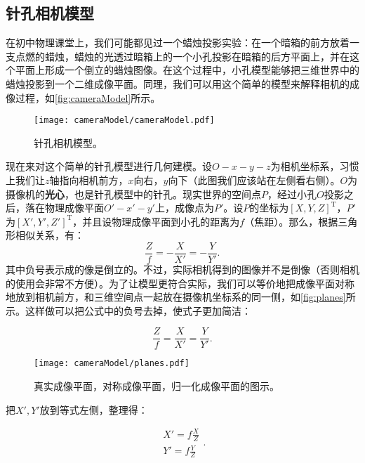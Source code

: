 \subsection{针孔相机模型}
在初中物理课堂上，我们可能都见过一个蜡烛投影实验：在一个暗箱的前方放着一支点燃的蜡烛，蜡烛的光透过暗箱上的一个小孔投影在暗箱的后方平面上，并在这个平面上形成一个倒立的蜡烛图像。在这个过程中，小孔模型能够把三维世界中的蜡烛投影到一个二维成像平面。同理，我们可以用这个简单的模型来解释相机的成像过程，如\autoref{fig:cameraModel}所示。

\begin{figure}[!ht]
	\centering
	\texttt{[image: cameraModel/cameraModel.pdf]}
	\caption{针孔相机模型。}
	\label{fig:cameraModel}
\end{figure}

现在来对这个简单的针孔模型进行几何建模。设$O-x-y-z$为相机坐标系，习惯上我们让$z$轴指向相机前方，$x$向右，$y$向下（此图我们应该站在左侧看右侧）。$O$为摄像机的\textbf{光心}，也是针孔模型中的针孔。现实世界的空间点$P$，经过小孔$O$投影之后，落在物理成像平面$O'-x'-y'$上，成像点为$P'$。设$P$的坐标为$[X,Y,Z]^\mathrm{T}$，$P'$为$[X',Y',Z']^\mathrm{T}$，并且设物理成像平面到小孔的距离为$f$（焦距）。那么，根据三角形相似关系，有：
\clearpage
\begin{equation}
\frac{Z}{f} = -\frac{X}{{X'}} =-\frac{Y}{{Y'}}.
\end{equation}
其中负号表示成的像是倒立的。不过，实际相机得到的图像并不是倒像（否则相机的使用会非常不方便）。为了让模型更符合实际，我们可以等价地把成像平面对称地放到相机前方，和三维空间点一起放在摄像机坐标系的同一侧，如\autoref{fig:planes}所示。这样做可以把公式中的负号去掉，使式子更加简洁：

\begin{equation}
\frac{Z}{f} = \frac{X}{{X'}} =\frac{Y}{{Y'}}.
\end{equation}

\begin{figure}[!htp]
	\centering
	\texttt{[image: cameraModel/planes.pdf]}
	\caption{真实成像平面，对称成像平面，归一化成像平面的图示。}
	\label{fig:planes}
\end{figure}

把$X', Y'$放到等式左侧，整理得：

\begin{equation}\label{eq:P2Pprime}
\begin{array}{l}
X' = f\frac{X}{Z}\\
Y' = f\frac{Y}{Z}
\end{array}.
\end{equation}

